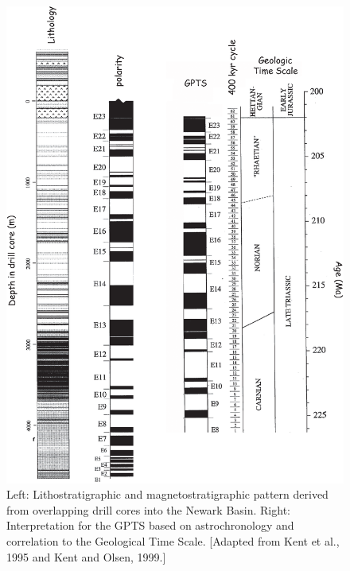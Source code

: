 \begin{figure}[h!tb]
\centering  \includegraphics[width=13 cm]{EPSfiles/newark.eps}
\caption{ Left: Lithostratigraphic and  magnetostratigraphic pattern derived from overlapping drill cores into the Newark Basin.  Right:  Interpretation for the GPTS based on astrochronology and correlation to the Geological Time Scale.  [Adapted from Kent et al., 1995 and Kent and Olsen, 1999.]}
\label{fig:newark}
\end{figure}



